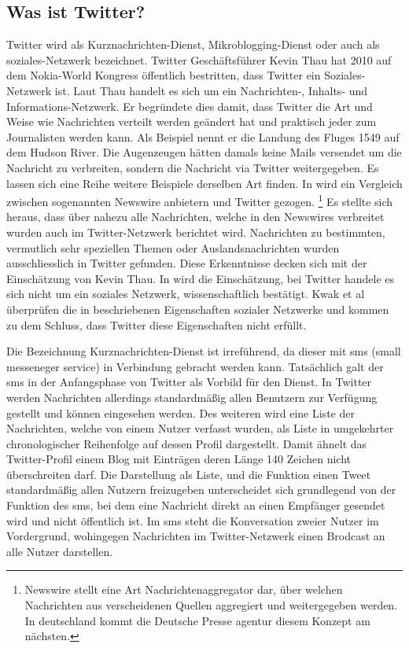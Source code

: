 			\subsection{Was ist Twitter?}
			Twitter wird als Kurznachrichten-Dienst, Mikroblogging-Dienst oder auch als soziales-Netzwerk bezeichnet. 
			Twitter Geschäftsführer Kevin Thau hat 2010 auf dem Nokia-World Kongress öffentlich bestritten, dass Twitter ein Soziales-Netzwerk ist. 
			Laut Thau handelt es sich um ein Nachrichten-, Inhalts- und Informations-Netzwerk. 
			Er begründete dies damit, dass Twitter die Art und Weise wie Nachrichten verteilt werden geändert hat und praktisch jeder zum Journalisten werden kann. 
			Als Beispiel nennt er die Landung des Fluges 1549 auf dem Hudson River. 
			Die Augenzeugen hätten damals keine Mails versendet um die Nachricht zu verbreiten, sondern die Nachricht via Twitter weitergegeben.
			Es lassen sich eine Reihe weitere Beispiele derselben Art finden. 
			In \cite{Petrovic2013} wird ein Vergleich zwischen sogenannten Newswire anbietern und Twitter gezogen. \footnote{Newswire stellt eine Art Nachrichtenaggregator dar, über welchen Nachrichten aus verscheidenen Quellen aggregiert und weitergegeben werden. In deutschland kommt die Deutsche Presse agentur diesem Konzept am nächsten.}
			Es stellte sich heraus, dass über nahezu alle Nachrichten, welche in den Newswires verbreitet wurden auch im Twitter-Netzwerk berichtet wird.
			Nachrichten zu bestimmten, vermutlich sehr speziellen Themen oder Auslandsnachrichten wurden ausschliesslich in Twitter gefunden. 
			Diese Erkenntnisse decken sich mit der Einschätzung von Kevin Thau. 
			In \cite{Kwak2010} wird die Einschätzung, bei Twitter handele es sich nicht um ein soziales Netzwerk, wissenschaftlich bestätigt.
			Kwak et al überprüfen die in \cite{Newman2003} beschriebenen Eigenschaften sozialer Netzwerke und kommen zu dem Schluss, dass Twitter diese Eigenschaften nicht erfüllt.	

			Die Bezeichnung Kurznachrichten-Dienst ist irreführend, da dieser mit sms (small messeneger service) in Verbindung gebracht werden kann. 
			Tatsächlich galt der sms in der Anfangsphase von Twitter als Vorbild für den Dienst.
			In Twitter werden Nachrichten allerdings standardmäßig allen Benutzern zur Verfügung gestellt und können eingesehen werden. 
			Des weiteren wird eine Liste der Nachrichten, welche von einem Nutzer verfasst wurden, als Liste in umgekehrter chronologischer Reihenfolge auf dessen Profil dargestellt.
			Damit ähnelt das Twitter-Profil einem Blog mit Einträgen deren Länge 140 Zeichen nicht überschreiten darf. 
			Die Darstellung als Liste, und die Funktion einen Tweet standardmäßig allen Nutzern freizugeben unterscheidet sich grundlegend von der Funktion des sms, bei dem eine Nachricht direkt an einen Empfänger gesendet wird und nicht öffentlich ist.
			Im sms steht die Konversation zweier Nutzer im Vordergrund, wohingegen Nachrichten im Twitter-Netzwerk einen Brodcast an alle Nutzer darstellen.

